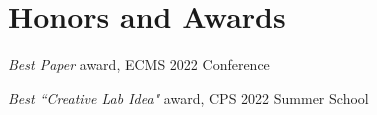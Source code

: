 \section{\sc Honors and Awards}
\textit{Best Paper} award, ECMS 2022 Conference

\textit{Best ``Creative Lab Idea"} award, CPS 2022 Summer School